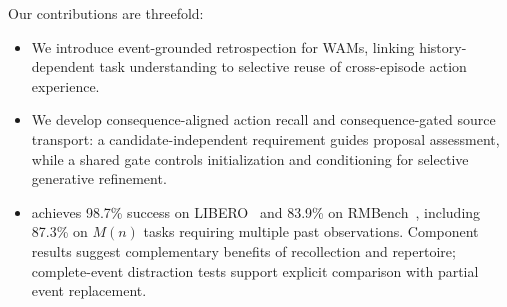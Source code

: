 Our contributions are threefold:
\begin{itemize}
    \item We introduce event-grounded retrospection for WAMs, linking history-dependent task understanding to selective reuse of cross-episode action experience.
    \item We develop consequence-aligned action recall and consequence-gated source transport: a candidate-independent requirement guides proposal assessment, while a shared gate controls initialization and conditioning for selective generative refinement.
    \item \method{} achieves 98.7\% success on LIBERO~\citep{liu2023libero} and 83.9\% on RMBench~\citep{chen2026rmbench}, including 87.3\% on $M(n)$ tasks requiring multiple past observations.
    Component results suggest complementary benefits of recollection and repertoire; complete-event distraction tests support explicit comparison with partial event replacement.
\end{itemize}
